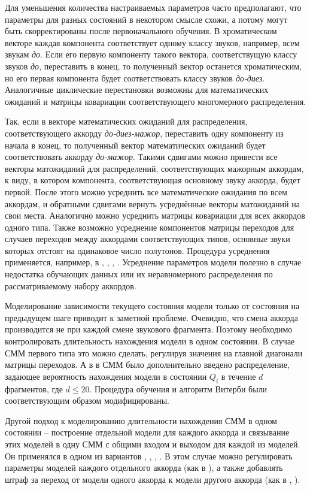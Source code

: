 Для уменьшения количества настраиваемых параметров часто предполагают, что
параметры для разных состояний в некотором смысле схожи, а потому могут быть
скорректированы после первоначального обучения. В хроматическом векторе каждая
компонента соответствует одному классу звуков, например, всем звукам \emph{до}.
Если его первую компоненту такого вектора, соответствущую классу звуков
\emph{до}, переставить в конец, то полученный вектор останется хроматическим,
но его первая компонента будет соответствовать классу звуков \emph{до-диез}.
Аналогичные циклические перестановки возможны для математических ожиданий и
матрицы ковариации соответствующего многомерного распределения.

Так, если в векторе математических ожиданий для распределения, соответствующего
аккорду \emph{до-диез-мажор}, переставить одну компоненту из начала в конец, то
полученный вектор математических ожиданий будет соответствовать аккорду
\emph{до-мажор}. Такими сдвигами можно привести все векторы матожиданий для
распределений, соответствующих мажорным аккордам, к виду, в котором компонента,
соответствующая основному звуку аккорда, будет первой. После этого можно
усреднить все математические ожидания по всем аккордам, и обратными сдвигами
вернуть усреднённые векторы матожиданий на свои места. Аналогично можно
усреднить матрицы ковариации для всех аккордов одного типа. Также возможно
усреднение компонентов матрицы переходов для случаев переходов между аккордами
соответствующих типов, основные звуки которых отстоят на одинаковое число
полутонов. Процедура усреднения применяется, например, в \cite{Sheh2003},
\cite{Papadopoulos2007}, \cite{Cho2010}, \cite{Khadkevich2011}. Усреднение
параметров модели полезно в случае недостатка обучающих данных или их
неравномерного распределения по рассматриваемому набору аккордов.

Моделирование зависимости текущего состояния модели только от состояния на
предыдущем шаге приводит к заметной проблеме. Очевидно, что смена аккорда
производится не при каждой смене звукового фрагмента. Поэтому необходимо
контролировать длительность нахождения модели в одном состоянии. В случае СММ
первого типа это можно сделать, регулируя значения на главной диагонали
матрицы переходов. А в \cite{Chen2012} в СММ было дополнительно введено
распределение, задающее вероятность нахождения модели в состоянии $Q_i$ в
течение $d$ фрагментов, где $d \leq 20$. Процедура обучения и алгоритм Витерби
были соответствующим образом модифицированы.

Другой подход к моделированию длительности нахождения СММ в одном состоянии --
построение отдельной модели для каждого аккорда и связывание этих моделей в
одну СММ с общими входом и выходом для каждой из моделей. Он применялся в одном
из вариантов \cite{Burgoyne2007}, \cite{Mauch2008}, \cite{Khadkevich2009},
\cite{Khadkevich2011}. В этом случае можно регулировать параметры моделей
каждого отдельного аккорда (как в \cite{Mauch2008}), а также добавлять штраф за
переход от модели одного аккорда к модели другого аккорда (как в
\cite{Khadkevich2009}, \cite{Khadkevich2011}).

